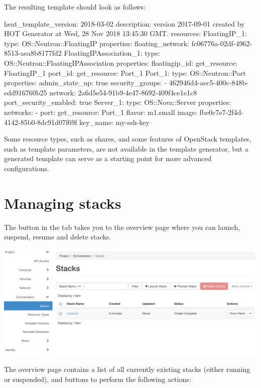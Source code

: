 The resulting template should look as follows:

\begin{code}{}
heat_template_version: 2018-03-02
description: version 2017-09-01 created by HOT Generator at Wed, 28 Nov 2018 13:45:30 GMT.
resources:
  FloatingIP_1:
    type: OS::Neutron::FloatingIP
    properties:
      floating_network: fc06776a-02df-4962-8513-aea8b8177fd2
  FloatingIPAssociation_1:
    type: OS::Neutron::FloatingIPAssociation
    properties:
      floatingip_id: { get_resource: FloatingIP_1 }
      port_id: { get_resource: Port_1 }
  Port_1:
    type: OS::Neutron::Port
    properties:
      admin_state_up: true
      security_groups:
        - 462946d4-aec5-400c-848b-edd916760b25
      network: 2a6d5e54-91b9-4e47-8692-409f4ce1e1c8
      port_security_enabled: true
  Server_1:
    type: OS::Nova::Server
    properties:
      networks:
        - port: { get_resource: Port_1 }
      flavor: m1.small
      image: fbe0c7e7-2f4d-4142-85b0-8dc91d07f69f
      key_name: my-ssh-key
\end{code}

Some resource types, such as shares, and some features of OpenStack
templates, such as template parameters, are not available in the
template generator, but a generated template can serve as a starting
point for more advanced configurations.

\section{Managing stacks}\label{sec:managing-stacks}
The  button in the  tab takes you
to the overview page where you can launch, suspend, resume and delete
stacks.
\begin{center}
  \includegraphics[width=\textwidth]{img/stacks_overview}
\end{center}
The overview page contains a list of all currently existing stacks
(either running or suspended), and buttons to perform the following
actions:

